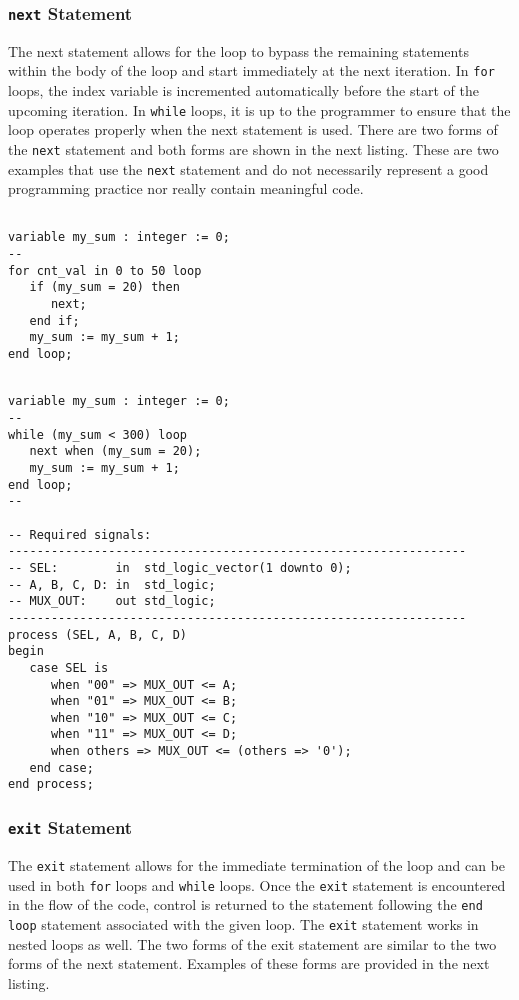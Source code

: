 \subsubsection{\texttt{next} Statement}
The next statement allows for the loop to bypass the remaining statements within the body of the loop and start immediately at the next iteration. In \texttt{for} loops, the index variable is incremented automatically before the start of the upcoming iteration. In \texttt{while} loops, it is up to the programmer to ensure that the loop operates properly when the next statement is used. There are two forms of the \texttt{next} statement and both forms are shown in the next listing. These are two examples that use the \texttt{next} statement and do not necessarily represent a good programming practice nor really contain meaningful code.

\vspace{10pt}
\noindent
\begin{minipage}{0.5\linewidth}
\begin{lstlisting}

variable my_sum : integer := 0;
--
for cnt_val in 0 to 50 loop
   if (my_sum = 20) then
      next;
   end if;
   my_sum := my_sum + 1;
end loop;
\end{lstlisting}
\end{minipage}
\noindent
\begin{minipage}{0.49\linewidth}
\begin{lstlisting}

variable my_sum : integer := 0;
--
while (my_sum < 300) loop
   next when (my_sum = 20);
   my_sum := my_sum + 1;
end loop;
--

-- Required signals:
----------------------------------------------------------------
-- SEL:        in  std_logic_vector(1 downto 0);
-- A, B, C, D: in  std_logic;
-- MUX_OUT:    out std_logic;
----------------------------------------------------------------
process (SEL, A, B, C, D)
begin
   case SEL is
      when "00" => MUX_OUT <= A;
      when "01" => MUX_OUT <= B;
      when "10" => MUX_OUT <= C;
      when "11" => MUX_OUT <= D;
      when others => MUX_OUT <= (others => '0');
   end case;
end process;

\end{lstlisting}
\end{minipage}

\subsubsection{\texttt{exit} Statement}
The \texttt{exit} statement allows for the immediate termination of the loop and can be used in both \texttt{for} loops and \texttt{while} loops. Once the \texttt{exit} statement is encountered in the flow of the code, control is returned to the statement following the \texttt{end loop} statement associated with the given loop. The \texttt{exit} statement works in nested loops as well. The two forms of the exit statement are similar to the two forms of the next statement. Examples of these forms are provided in the next listing.

